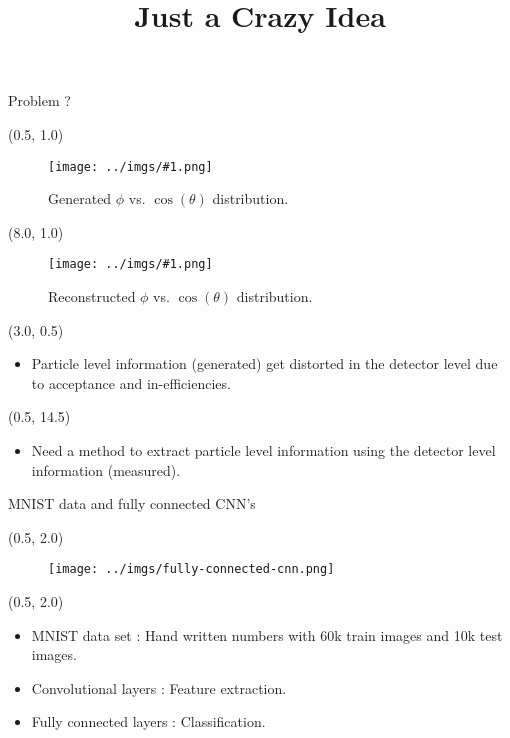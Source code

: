 \documentclass[10pt, xcolor={dvipsnames}, aspectratio = 169, sans,mathserif]{beamer}
\title{Just a Crazy Idea}
\newcommand{\leftpic}[2]
{
\begin{textblock}{7.0}(0.5, 1.0)
\begin{figure}
    \centering
    \texttt{[image: ../imgs/\#1.png]}
    \caption{#2}
\end{figure}
\end{textblock}
}
\newcommand{\rightpic}[2]
{
\begin{textblock}{7.0}(8.0, 1.0)
\begin{figure}
    \centering
    \texttt{[image: ../imgs/\#1.png]}
    \caption{#2}
\end{figure}
\end{textblock}
}
\begin{document}
\begin{frame}
    \maketitle
\end{frame}

\begin{frame}[fragile]{Problem ?}

\leftpic{phi_costh_mc}{Generated $\phi$ vs. $\cos(\theta)$ distribution.}

\rightpic{phi_costh}{Reconstructed $\phi$ vs. $\cos(\theta)$ distribution.}

\begin{textblock}{13.0}(3.0, 0.5)
\begin{itemize}
    \item Particle level information (generated) get distorted in the detector level due to acceptance and in-efficiencies.
\end{itemize}
\end{textblock}

\begin{textblock}{15.0}(0.5, 14.5)
\begin{itemize}
    \item Need a method to extract particle level information using the detector level information (measured).
\end{itemize}
\end{textblock}

\end{frame}

\begin{frame}{MNIST data and fully connected CNN's}

\begin{textblock}{14.0}(0.5, 2.0)
\begin{figure}
    \centering
    \texttt{[image: ../imgs/fully-connected-cnn.png]}
\end{figure}
\end{textblock}

\begin{textblock}{10.0}(0.5, 2.0)
\begin{itemize}

    \item MNIST data set : Hand written numbers with 60k train images and 10k test images.

    \item Convolutional layers : Feature extraction.

    \item Fully connected layers : Classification.
\end{itemize}
\end{textblock}

\end{frame}
\end{document}
